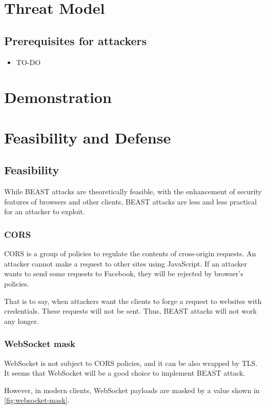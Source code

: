 \documentclass{acm_proc_article-sp}
\begin{document}
\section{Threat Model}
\subsection{Prerequisites for attackers}
\begin{itemize}
    \item TO-DO
\end{itemize}

\section{Demonstration}
\section{Feasibility and Defense}
\subsection{Feasibility}
While BEAST attacks are theoretically feasible, with the enhancement of security
features of browsers and other clients, BEAST attacks are less and less practical
for an attacker to exploit.

\subsubsection{CORS}
CORS is a group of policies to regulate the contents of cross-origin requests.
An attacker cannot make a request to other sites using JavaScript. If an attacker
wants to send some requests to Facebook, they will be rejected by browser's policies.

That is to say, when attackers want the clients to forge a request to websites with
credentials. These requests will not be sent. Thus, BEAST attacks will not work
any longer.

\subsubsection{WebSocket mask}
WebSocket is not subject to CORS policies, and it can be also wrapped by TLS.
It seems that WebSocket will be a good choice to implement BEAST attack.

However, in modern clients, WebSocket payloads are masked by a value shown in \ref{fig:websocket-mask}.
\end{document}
